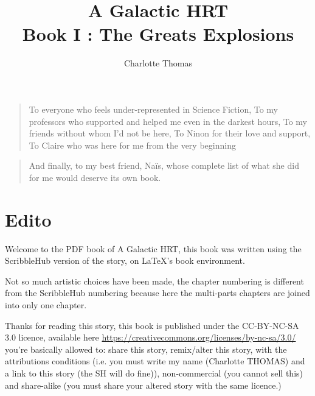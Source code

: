 \documentclass[hidelinks,12pt,a4paper]{book}
\title{A Galactic HRT \\ Book I : The Greats Explosions}
\author{Charlotte Thomas}
\newenvironment{dedication}
    {\vspace{6ex}\begin{quotation}\begin{em}}
    {\par\end{em}\end{quotation}}
\begin{document}
    \maketitle
    \begin{dedication}
      To everyone who feels under-represented in Science Fiction,\newline
      To my professors who supported and helped me even in the darkest hours,\newline
      To my friends without whom I'd not be here,\newline
      To Ninon for their love and support,\newline
      To Claire who was here for me from the very beginning
    \end{dedication}

    \begin{dedication}
      \begin{center}
      And finally, to my best friend, Naïs, whose complete list of what she did for me would deserve its own book.
      \end{center}
    \end{dedication}
    
    \tableofcontents
    
    \chapter*{Edito}
    Welcome to the PDF book of A Galactic HRT, this book was written using the ScribbleHub version of the story, on \LaTeX's book 
    environment.\par 
    \bigskip
    Not so much artistic choices have been made, the chapter numbering is different from the ScribbleHub numbering 
    because here the multi-parts chapters are joined into only one chapter.
    \par
    \bigskip 
    Thanks for reading this story, this book is published under the CC-BY-NC-SA 3.0 licence, available here 
    \url{https://creativecommons.org/licenses/by-nc-sa/3.0/}
    you're basically allowed to: share this story, remix/alter this story, with the attributions conditions (i.e. you must 
    write my name (Charlotte THOMAS) and a link to this story (the SH will do fine)), non-commercial (you cannot 
    sell this) and share-alike (you must share your altered story with the same licence.)
\end{document}
